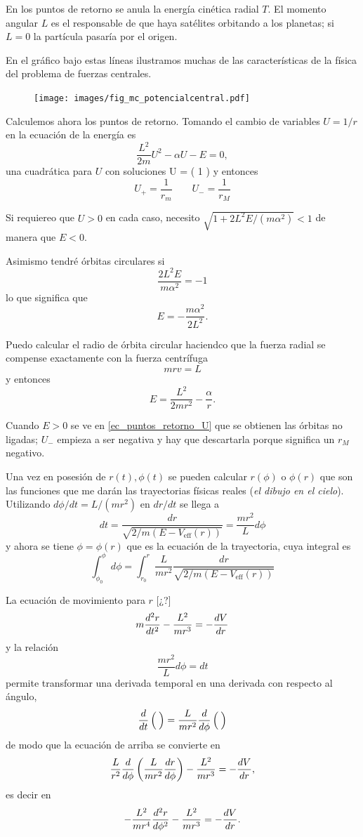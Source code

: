 \documentclass[10pt,oneside]{CBFT_book}
\begin{document}
En los puntos de retorno se anula la energía cinética radial $T$.
El momento angular $L$ es el responsable de que haya satélites orbitando a los planetas; si $L=0$ la partícula pasaría 
por el origen.

En el gráfico bajo estas líneas ilustramos muchas de las características de la física del problema
de fuerzas centrales.

\begin{figure}[!hbt]
	\begin{center}
	\texttt{[image: images/fig\_mc\_potencialcentral.pdf]}	 
	\end{center}
	\caption{}
\end{figure} 


Calculemos ahora los puntos de retorno.
Tomando el cambio de variables $U=1/r$ en la ecuación de la energía es
\[
	\frac{L^2}{2m} U^2 - \alpha U - E = 0,
\]
una cuadrática para $U$ con soluciones
\be
	U = \left( 1 \pm {}\right)
	\label{ec_puntos_retorno_U}
\ee
y entonces
\[
	U_+ = \frac{1}{r_m} \qquad U_- = \frac{1}{r_M}
\]

Si requiereo que $U>0$ en cada caso, necesito $ \sqrt{1 + 2L^2E/(m\alpha^2) } < 1 $ de manera que $ E < 0 $.

Asimismo tendré órbitas circulares si
\[
	\frac{ 2 L^2 E }{ m \alpha^2 } = - 1
\]
lo que significa que 
\[
	E = -\frac{m\alpha^2}{2L^2}.
\]

Puedo calcular el radio de órbita circular haciendco que la fuerza radial se compense exactamente con la fuerza 
centrífuga
\[
	m r v = L
\]
y entonces
\[
	E = \frac{L^2}{2mr^2} - \frac{\alpha}{r}.
\]

Cuando $E>0$ se ve en \eqref{ec_puntos_retorno_U} que se obtienen las órbitas no ligadas; $U_-$ empieza a ser negativa 
y hay que descartarla porque significa un $r_M$ negativo.

Una vez en posesión de $r(t), \phi(t)$ se pueden calcular $r(\phi)$ o $\phi(r)$ que son las funciones que me darán las
trayectorias físicas reales ({\it el dibujo en el cielo}).
Utilizando $d\phi/dt = L/(m r^2 )$ en $dr/dt$ se llega a 
\[
	dt = \frac{dr}{\sqrt{2/m(E-V_{\text{eff}}(r))}}  = \frac{ m r^2 }{ L } d\phi
\]
y ahora se tiene $\phi = \phi(r)$ que es la ecuación de la trayectoria, cuya integral es
\[
	\int_{\phi_0}^{\phi} d\phi = \int_{r_0}^r \frac{L}{mr^2} \frac{dr}{\sqrt{2/m(E-V_{\text{eff}}(r))}}
\]

La ecuación de movimiento para $r$ [¿?]
\[
	m \dtot[2]{r}{t} - \frac{L^2}{mr^3} = -\dtot{V}{r}
\]
y la relación 
\[
	\frac{mr^2}{L} d\phi = dt
\]
permite transformar una derivada temporal en una derivada con respecto al ángulo,
\[
	\dtot{}{t}\left( \phantom{\frac{}{}} \right) = \frac{L}{mr^2} \dtot{}{\phi}\left( \phantom{\frac{}{}} \right)
\]
de modo que la ecuación de arriba se convierte en
\[
	\frac{L}{r^2}\dtot{}{\phi}\left( \frac{L}{mr^2} \dtot{r}{\phi} \right) - \frac{L^2}{mr^3} = -\dtot{V}{r},
\]
es decir en
\[
	-\frac{L^2}{mr^4}\dtot[2]{r}{\phi} - \frac{L^2}{mr^3} = -\dtot{V}{r}.
\]
\end{document}
